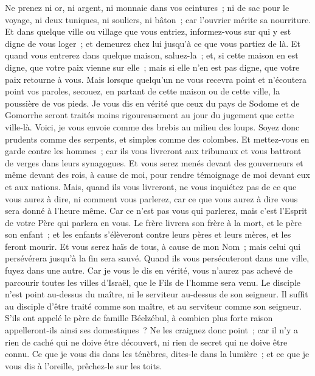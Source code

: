 \begin{multicols}{2}
Ne prenez ni or, ni argent, ni monnaie dans vos ceintures~;
ni de sac pour le voyage, ni deux tuniques, ni souliers, ni bâton~; car l'ouvrier mérite sa nourriture.
Et dans quelque ville ou village que vous entriez, informez-vous sur qui y est digne de vous loger~; et demeurez chez lui jusqu'à ce que vous partiez de là.
Et quand vous entrerez dans quelque maison, saluez-la~;
et, si cette maison en est digne, que votre paix vienne sur elle~; mais si elle n'en est pas digne, que votre paix retourne à vous.
Mais lorsque quelqu'un ne vous recevra point et n'écoutera point vos paroles, secouez, en partant de cette maison ou de cette ville, la poussière de vos pieds.
Je vous dis en vérité que ceux du pays de Sodome et de Gomorrhe seront traités moins rigoureusement au jour du jugement que cette ville-là.
Voici, je vous envoie comme des brebis au milieu des loups. Soyez donc prudents comme des serpents, et simples comme des colombes.
Et mettez-vous en garde contre les hommes~; car ils vous livreront aux tribunaux et vous battront de verges dans leurs synagogues.
Et vous serez menés devant des gouverneurs et même devant des rois, à cause de moi, pour rendre témoignage de moi devant eux et aux nations.
Mais, quand ils vous livreront, ne vous inquiétez pas de ce que vous aurez à dire, ni comment vous parlerez, car ce que vous aurez à dire vous sera donné à l'heure même.
Car ce n'est pas vous qui parlerez, mais c'est l'Esprit de votre Père qui parlera en vous.
Le frère livrera son frère à la mort, et le père son enfant~; et les enfants s'élèveront contre leurs pères et leurs mères, et les feront mourir.
Et vous serez haïs de tous, à cause de mon Nom~; mais celui qui persévérera jusqu'à la fin sera sauvé.
Quand ils vous persécuteront dans une ville, fuyez dans une autre. Car je vous le dis en vérité, vous n'aurez pas achevé de parcourir toutes les villes d'Israël, que le Fils de l'homme sera venu.
Le disciple n'est point au-dessus du maître, ni le serviteur au-dessus de son seigneur.
Il suffit au disciple d'être traité comme son maître, et au serviteur comme son seigneur. S'ils ont appelé le père de famille Béelzébul, à combien plus forte raison appelleront-ils ainsi ses domestiques~?
Ne les craignez donc point~; car il n'y a rien de caché qui ne doive être découvert, ni rien de secret qui ne doive être connu.
Ce que je vous dis dans les ténèbres, dites-le dans la lumière~; et ce que je vous dis à l'oreille, prêchez-le sur les toits.

\end{multicols}

